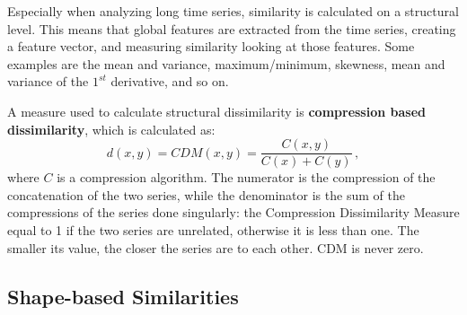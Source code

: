 Especially when analyzing long time series, similarity is calculated on a structural level. This means that global features are extracted from the time series, creating a feature vector, and measuring similarity looking at those features. Some examples are the mean and variance, maximum/minimum, skewness, mean and variance of the $1^{st}$ derivative, and so on.

A measure used to calculate structural dissimilarity is \textbf{compression based dissimilarity}, which is calculated as:
\begin{equation*}
    d(x,y) = CDM(x,y) = \dfrac{C(x,y)}{C(x) + C(y)} \,,
\end{equation*}
where $C$ is a compression algorithm. The numerator is the compression of the concatenation of the two series, while the denominator is the sum of the compressions of the series done singularly: the Compression Dissimilarity Measure equal to 1 if the two series are unrelated, otherwise it is less than one. The smaller its value, the closer the series are to each other. CDM is never zero.

\subsection{Shape-based Similarities}

